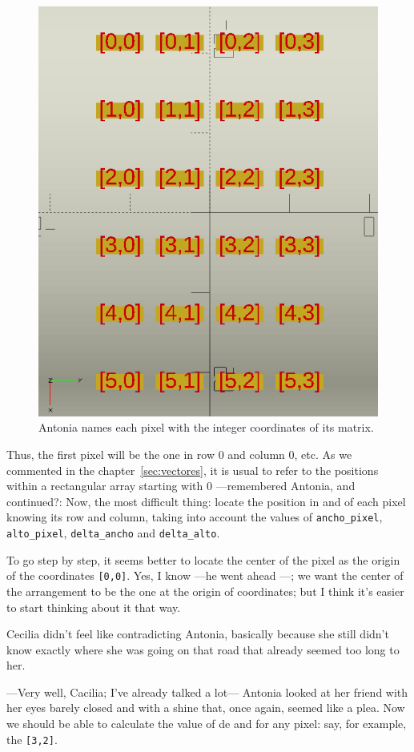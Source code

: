 \begin{figure}[ht]
  \centering
  \includegraphics[width=.45\textwidth]{imagenes/matriz-anotada-coordenadas}
  \caption{Antonia names each pixel with the integer coordinates of its matrix.}
  \label{fig:matriz-anotada-coordenadas}
\end{figure}
  
\guillemotright{}Thus, the first pixel will be the one in row 0 and column 0, etc. As we commented in the chapter~\ref{sec:vectores}, it is usual to refer to the positions within a rectangular array starting with 0 ---remembered Antonia, and continued?: Now, the most difficult thing: locate the position in  and  of each pixel knowing its row and column, taking
into account the values of \texttt{ancho\_pixel}, \texttt{alto\_pixel}, \texttt{delta\_ancho} and
\texttt{delta\_alto}.

\guillemotright{}To go step by step, it seems better to locate the center of the
pixel as the origin of the coordinates \texttt{[0,0]}. Yes, I know ---he went ahead
---; we want the center of the arrangement to be the one at the origin of coordinates; but I think it's easier to start thinking about it that way.

Cecilia didn't feel like contradicting Antonia, basically because she still didn't know exactly where she was going on that road that already seemed too long to her.

---Very well, Cacilia; I've already talked a lot--- Antonia looked at her friend with her eyes barely closed and with a shine that, once again, seemed like a plea. Now we should be able to calculate the value of de  and  for any pixel: say, for example, the  \texttt{[3,2]}.

